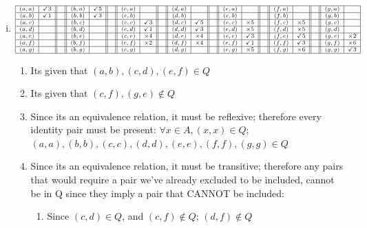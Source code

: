 \documentclass[12pt]{article}
\begin{document}
	\begin{enumerate}[(i)]
		\item
			\[
				\scriptsize
				\begin{array}{|c|c||c||c|c||c||c|c||c||c|c||c||c|c||c||c|c||c||c|c|}
					\hline
					(a,a) & \checkmark3 &  & (b,a) & \checkmark5 &  & (c,a) &             &  & (d,a) &             &  & (e,a) &             &  & (f,a) &             &  & (g,a) &             \\
					\hline
					(a,b) & \checkmark1 &  & (b,b) & \checkmark3 &  & (c,b) &             &  & (d,b) &             &  & (e,b) &             &  & (f,b) &             &  & (g,b) &             \\
					\hline
					(a,c) &             &  & (b,c) &             &  & (c,c) & \checkmark3 &  & (d,c) & \checkmark5 &  & (e,c) & \times 5    &  & (f,c) & \times 5    &  & (g,c) &             \\
					\hline
					(a,d) &             &  & (b,d) &             &  & (c,d) & \checkmark1 &  & (d,d) & \checkmark3 &  & (e,d) & \times 5    &  & (f,d) & \times 5    &  & (g,d) &             \\
					\hline
					(a,e) &             &  & (b,e) &             &  & (c,e) & \times 4    &  & (d,e) & \times 4    &  & (e,e) & \checkmark3 &  & (f,e) & \checkmark5 &  & (g,e) & \times 2    \\
					\hline
					(a,f) &             &  & (b,f) &             &  & (c,f) & \times 2    &  & (d,f) & \times 4    &  & (e,f) & \checkmark1 &  & (f,f) & \checkmark3 &  & (g,f) & \times 6    \\
					\hline
					(a,g) &             &  & (b,g) &             &  & (c,g) &             &  & (d,g) &             &  & (e,g) & \times 5    &  & (f,g) & \times 6    &  & (g,g) & \checkmark3 \\
					\hline
				\end{array}
			\]
			\begin{enumerate}[1.]
				\item Its given that $(a,b),(c,d),(e,f) \in Q$

				\item Its given that $(c,f),(g,e) \not\in Q$

				\item Since its an equivalence relation, it must be reflexive; therefore
					every identity pair must be present: $\forall x \in A, (x,x) \in Q$; $(
					a,a),(b,b),(c,c),(d,d),(e,e),(f,f),(g,g) \in Q$

				\item Since its an equivalence relation, it must be transitive; therefore
					any pairs that would require a pair we've already excluded to be included,
					cannot be in Q since they imply a pair that CANNOT be included:
					\begin{enumerate}[-]
						\item Since $(c,d) \in Q$, and $(c,f) \not\in Q$; $(d,f) \not\in Q$


\end{enumerate}
\end{enumerate}
\end{enumerate}
\end{document}
